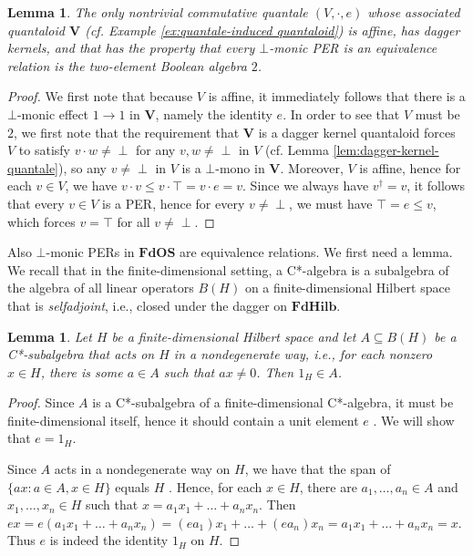 \documentclass[12pt]{tac}
\newtheorem{lemma}[theorem]{Lemma}
\theoremstyle{definition}
\theoremstyle{remark}
\newcommand{\<}{\langle}
\renewcommand{\>}{\rangle}
\renewcommand{\:}{\colon}
\begin{document}
\begin{lemma}\label{lem:2}
The only nontrivial commutative quantale $(V,\cdot,e)$ whose associated quantaloid $\mathbf V$ (cf. Example \ref{ex:quantale-induced quantaloid}) is affine, has dagger kernels, and that has the property that every $\bot$-monic PER is an equivalence relation is the two-element Boolean algebra $2$.
\end{lemma}
\begin{proof}We first note that because $V$ is affine, it immediately follows that there is a $\bot$-monic effect $1\to 1$ in $\mathbf V$, namely the identity $e$. In order to see that $V$ must be $2$, we first note that the requirement that $\mathbf V$ is a dagger kernel quantaloid forces $V$ to  satisfy $v\cdot w\neq\perp$ for any $v,w\neq\perp$ in $V$ (cf. Lemma \ref{lem:dagger-kernel-quantale}), so any $v\neq\perp$ in $V$ is a $\bot$-mono in $\mathbf V$. Moreover, $V$ is affine, hence for each $v\in V$, we have $v\cdot v\leq v\cdot \top=v\cdot e=v$. Since we always have $v^\dag=v$, it follows that every $v\in V$ is a PER, hence for every $v\neq\perp$, we must have $\top=e\leq v$, which forces $v=\top$ for all $v\neq\perp$. 
\end{proof}



Also $\bot$-monic PERs in $\mathbf{FdOS}$ are equivalence relations. We first need a lemma. We recall that in the finite-dimensional setting, a C*-algebra is a subalgebra of the algebra of all linear operators $B(H)$ on a finite-dimensional Hilbert space that is \emph{selfadjoint}, i.e.,  closed under the dagger on $\mathbf{FdHilb}$. 

\begin{lemma}\label{lem:nondegenerate acting subalgebra is unital}
    Let $H$ be a finite-dimensional Hilbert space and let $A\subseteq B(H)$ be a C*-subalgebra that acts on $H$ in a nondegenerate way, i.e., for each nonzero $x\in H$, there is some $a\in A$ such that $ax\neq 0$. Then $1_H\in A$.
\end{lemma}
\begin{proof}
    Since $A$ is a C*-subalgebra of a finite-dimensional C*-algebra, it must be finite-dimensional itself, hence it should contain a unit element $e$ \cite[Lemma 11.1]{takesaki:oa1}. We will show that $e=1_H$.

    Since $A$ acts in a nondegenerate way on $H$, we have that the span of $\{ax:a\in A,x\in H\}$ equals $H$ \cite[Proposition 9.2]{takesaki:oa1}. Hence, for each $x\in H$, there are $a_1,\ldots,a_n\in A$ and $x_1,\ldots,x_n\in H$ such that $x=a_1x_1+\ldots+a_nx_n$. Then $ex=e(a_1x_1+\ldots+a_nx_n)=(ea_1)x_1+\ldots+(ea_n)x_n=a_1x_1+\ldots+a_nx_n=x$. Thus $e$ is indeed the identity $1_H$ on $H$.
\end{proof}
\end{document}
